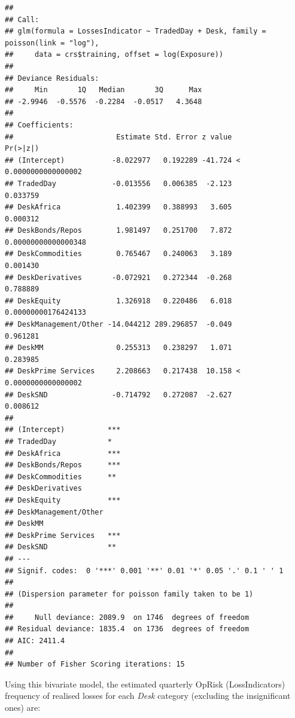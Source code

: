 \documentclass{DissertateUSU}
\begin{document}
\begin{verbatim}
## 
## Call:
## glm(formula = LossesIndicator ~ TradedDay + Desk, family = poisson(link = "log"), 
##     data = crs$training, offset = log(Exposure))
## 
## Deviance Residuals: 
##     Min       1Q   Median       3Q      Max  
## -2.9946  -0.5576  -0.2284  -0.0517   4.3648  
## 
## Coefficients:
##                        Estimate Std. Error z value             Pr(>|z|)
## (Intercept)           -8.022977   0.192289 -41.724 < 0.0000000000000002
## TradedDay             -0.013556   0.006385  -2.123             0.033759
## DeskAfrica             1.402399   0.388993   3.605             0.000312
## DeskBonds/Repos        1.981497   0.251700   7.872  0.00000000000000348
## DeskCommodities        0.765467   0.240063   3.189             0.001430
## DeskDerivatives       -0.072921   0.272344  -0.268             0.788889
## DeskEquity             1.326918   0.220486   6.018  0.00000000176424133
## DeskManagement/Other -14.044212 289.296857  -0.049             0.961281
## DeskMM                 0.255313   0.238297   1.071             0.283985
## DeskPrime Services     2.208663   0.217438  10.158 < 0.0000000000000002
## DeskSND               -0.714792   0.272087  -2.627             0.008612
##                         
## (Intercept)          ***
## TradedDay            *  
## DeskAfrica           ***
## DeskBonds/Repos      ***
## DeskCommodities      ** 
## DeskDerivatives         
## DeskEquity           ***
## DeskManagement/Other    
## DeskMM                  
## DeskPrime Services   ***
## DeskSND              ** 
## ---
## Signif. codes:  0 '***' 0.001 '**' 0.01 '*' 0.05 '.' 0.1 ' ' 1
## 
## (Dispersion parameter for poisson family taken to be 1)
## 
##     Null deviance: 2089.9  on 1746  degrees of freedom
## Residual deviance: 1835.4  on 1736  degrees of freedom
## AIC: 2411.4
## 
## Number of Fisher Scoring iterations: 15
\end{verbatim}

\doublespacing

Using this bivariate model, the estimated quarterly OpRisk
(LossIndicators) frequency of realised losses for each \emph{Desk}
category (excluding the insignificant ones) are:
\end{document}
